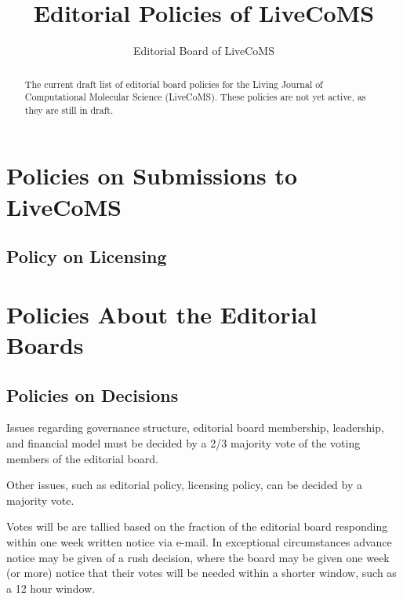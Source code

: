 \documentclass{article}
\begin{document}
\title{Editorial Policies of LiveCoMS}
\author{Editorial Board of LiveCoMS}

\maketitle

\begin{abstract}
The current draft list of editorial board policies for the Living
Journal of Computational Molecular Science (LiveCoMS). These policies
are not yet active, as they are still in draft.
\end{abstract}

\section{Policies on Submissions to LiveCoMS}

\subsection{Policy on Licensing}



\section{Policies About the Editorial Boards}

\subsection{Policies on Decisions}
Issues regarding governance structure, editorial board membership, leadership, and financial
model must be decided by a 2/3 majority vote of the voting members of the editorial
board.

Other issues, such as editorial policy, licensing policy, can be
decided by a majority vote.

Votes will be are tallied based on the fraction of the editorial board
responding within one week written notice via e-mail. In exceptional
circumstances advance notice may be given of a rush decision, where
the board may be given one week (or more) notice that their votes will
be needed within a shorter window, such as a 12 hour window.
\end{document}
